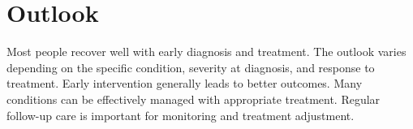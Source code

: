 \section{Outlook}
Most people recover well with early diagnosis and treatment. The outlook varies depending on the specific condition, severity at diagnosis, and response to treatment. Early intervention generally leads to better outcomes. Many conditions can be effectively managed with appropriate treatment. Regular follow-up care is important for monitoring and treatment adjustment.
